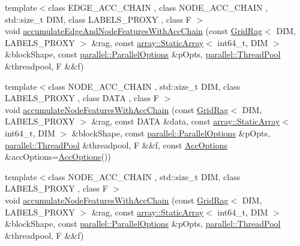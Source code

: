 \begin{DoxyCompactItemize}
\item 
{\footnotesize template$<$class E\+D\+G\+E\+\_\+\+A\+C\+C\+\_\+\+C\+H\+A\+IN , class N\+O\+D\+E\+\_\+\+A\+C\+C\+\_\+\+C\+H\+A\+IN , std\+::size\+\_\+t D\+IM, class L\+A\+B\+E\+L\+S\+\_\+\+P\+R\+O\+XY , class F $>$ }\\void \hyperlink{namespacenifty_1_1graph_a5e388756ae7e421f92ef5f78494b94d7}{accumulate\+Edge\+And\+Node\+Features\+With\+Acc\+Chain} (const \hyperlink{classnifty_1_1graph_1_1GridRag}{Grid\+Rag}$<$ D\+IM, L\+A\+B\+E\+L\+S\+\_\+\+P\+R\+O\+XY $>$ \&rag, const \hyperlink{namespacenifty_1_1array_a683f151f19c851754e0c6d55ed16a0c2}{array\+::\+Static\+Array}$<$ int64\+\_\+t, D\+IM $>$ \&block\+Shape, const \hyperlink{classnifty_1_1parallel_1_1ParallelOptions}{parallel\+::\+Parallel\+Options} \&p\+Opts, \hyperlink{classnifty_1_1parallel_1_1ThreadPool}{parallel\+::\+Thread\+Pool} \&threadpool, F \&\&f)
\item 
{\footnotesize template$<$class N\+O\+D\+E\+\_\+\+A\+C\+C\+\_\+\+C\+H\+A\+IN , std\+::size\+\_\+t D\+IM, class L\+A\+B\+E\+L\+S\+\_\+\+P\+R\+O\+XY , class D\+A\+TA , class F $>$ }\\void \hyperlink{namespacenifty_1_1graph_a2cfa949da8b5193deb5fb6d898154e23}{accumulate\+Node\+Features\+With\+Acc\+Chain} (const \hyperlink{classnifty_1_1graph_1_1GridRag}{Grid\+Rag}$<$ D\+IM, L\+A\+B\+E\+L\+S\+\_\+\+P\+R\+O\+XY $>$ \&rag, const D\+A\+TA \&data, const \hyperlink{namespacenifty_1_1array_a683f151f19c851754e0c6d55ed16a0c2}{array\+::\+Static\+Array}$<$ int64\+\_\+t, D\+IM $>$ \&block\+Shape, const \hyperlink{classnifty_1_1parallel_1_1ParallelOptions}{parallel\+::\+Parallel\+Options} \&p\+Opts, \hyperlink{classnifty_1_1parallel_1_1ThreadPool}{parallel\+::\+Thread\+Pool} \&threadpool, F \&\&f, const \hyperlink{structnifty_1_1graph_1_1AccOptions}{Acc\+Options} \&acc\+Options=\hyperlink{structnifty_1_1graph_1_1AccOptions}{Acc\+Options}())
\item 
{\footnotesize template$<$class N\+O\+D\+E\+\_\+\+A\+C\+C\+\_\+\+C\+H\+A\+IN , std\+::size\+\_\+t D\+IM, class L\+A\+B\+E\+L\+S\+\_\+\+P\+R\+O\+XY , class F $>$ }\\void \hyperlink{namespacenifty_1_1graph_a1464a1e4da963bdaf932c41c042f734e}{accumulate\+Node\+Features\+With\+Acc\+Chain} (const \hyperlink{classnifty_1_1graph_1_1GridRag}{Grid\+Rag}$<$ D\+IM, L\+A\+B\+E\+L\+S\+\_\+\+P\+R\+O\+XY $>$ \&rag, const \hyperlink{namespacenifty_1_1array_a683f151f19c851754e0c6d55ed16a0c2}{array\+::\+Static\+Array}$<$ int64\+\_\+t, D\+IM $>$ \&block\+Shape, const \hyperlink{classnifty_1_1parallel_1_1ParallelOptions}{parallel\+::\+Parallel\+Options} \&p\+Opts, \hyperlink{classnifty_1_1parallel_1_1ThreadPool}{parallel\+::\+Thread\+Pool} \&threadpool, F \&\&f)

\end{DoxyCompactItemize}
